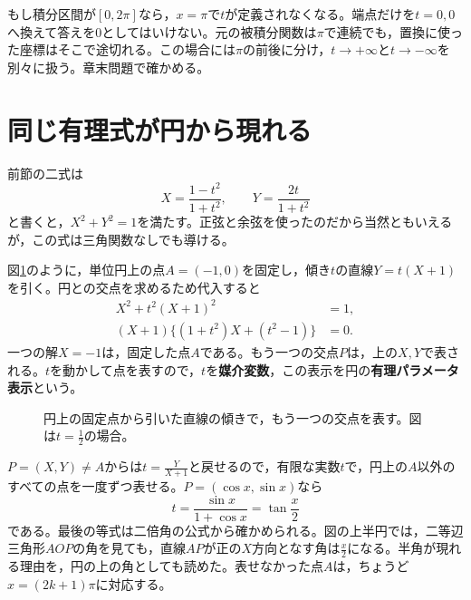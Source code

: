 もし積分区間が$[0,2\pi]$なら，$x=\pi$で$t$が定義されなくなる。端点だけを$t=0,0$へ換えて答えを$0$としてはいけない。元の被積分関数は$\pi$で連続でも，置換に使った座標はそこで途切れる。この場合には$\pi$の前後に分け，$t\to+\infty$と$t\to-\infty$を別々に扱う。章末問題で確かめる。

\section{同じ有理式が円から現れる}\label{節:円の有理パラメータ}

前節の二式は
\[
X=\frac{1-t^2}{1+t^2},\qquad
Y=\frac{2t}{1+t^2}
\]
と書くと，$X^2+Y^2=1$を満たす。正弦と余弦を使ったのだから当然ともいえるが，この式は三角関数なしでも導ける。

図\ref{図:円の有理パラメータ}のように，単位円上の点$A=(-1,0)$を固定し，傾き$t$の直線$Y=t(X+1)$を引く。円との交点を求めるため代入すると
\[
\begin{aligned}
X^2+t^2(X+1)^2&=1,\\
(X+1)\{(1+t^2)X+(t^2-1)\}&=0.
\end{aligned}
\]
一つの解$X=-1$は，固定した点$A$である。もう一つの交点$P$は，上の$X,Y$で表される。$t$を動かして点を表すので，$t$を\textbf{媒介変数}，この表示を円の\textbf{有理パラメータ表示}という。

\begin{figure}[htbp]
\centering
{}
\caption{円上の固定点から引いた直線の傾きで，もう一つの交点を表す。図は$t=\frac12$の場合。}
\label{図:円の有理パラメータ}
\end{figure}

$P=(X,Y)\ne A$からは$t=\frac{Y}{X+1}$と戻せるので，有限な実数$t$で，円上の$A$以外のすべての点を一度ずつ表せる。$P=(\cos x,\sin x)$なら
\[
t=\frac{\sin x}{1+\cos x}=\tan\frac x2
\]
である。最後の等式は二倍角の公式から確かめられる。図の上半円では，二等辺三角形$AOP$の角を見ても，直線$AP$が正の$X$方向となす角は$\frac x2$になる。半角が現れる理由を，円の上の角としても読めた。表せなかった点$A$は，ちょうど$x=(2k+1)\pi$に対応する。

